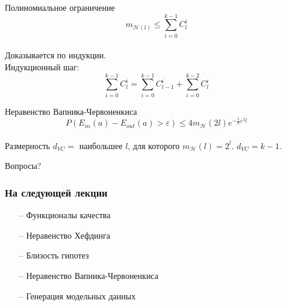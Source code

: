 \documentclass[10pt]{beamer}
\begin{document}
\begin{frame}{Полиномиальное ограничение}  
  $$m_{\mathcal{H}(l)} \leq \sum\limits_{i=0}^{k-1} C_l^i$$\\
  Доказывается по индукции.\\
  Индукционный шаг:
  $$\sum\limits_{i=0}^{k-1} C_l^i = \sum\limits_{i=0}^{k-1} C_{l-1}^i + \sum\limits_{i=0}^{k-2} C_l^i$$
\end{frame}

\begin{frame}{Неравенство Вапника-Червоненкиса}  
  $$P(E_{in}(a) - E_{out}(a) > \varepsilon) \leq 4 m_{\mathcal{H}}(2l) e^{-\frac{1}{8}\varepsilon^2l}$$\\
  \bigbreak
  Размерность $d_{VC} = $ наибольшее $l$, для которого $m_{\mathcal{H}}(l) = 2^l$. $d_{VC} = k-1$.
  
\end{frame}

\begin{frame}[standout]
  Вопросы?
\end{frame}

\appendix

\begin{frame}\frametitle{На следующей лекции}
	\begin{itemize}
    	\item[--] Функционалы качества
    	\item[--] Неравенство Хефдинга
    	\item[--] Близость гипотез
    	\item[--] Неравенство Вапника-Червоненкиса
    	\item[--] Генерация модельных данных    	    	
	\end{itemize}
\end{frame}
\end{document}
